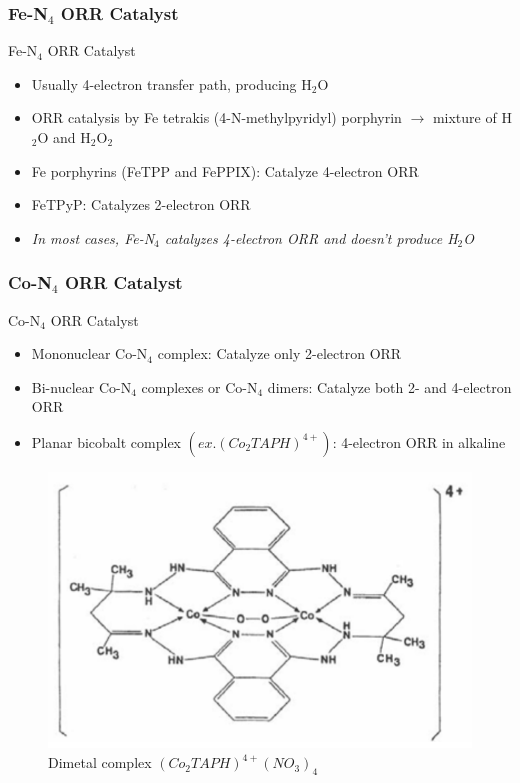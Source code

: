 \documentclass{beamer}
\begin{document}
\begin{frame}
\frametitle{Fe-N$_4$ ORR Catalyst}
\begin{block}{Fe-N$_4$ ORR Catalyst}

\begin{itemize}
\item{Usually 4-electron transfer path, producing H$_2$O}
\item{ORR catalysis by Fe tetrakis (4-N-methylpyridyl) porphyrin $\longrightarrow$ mixture of H$_2$O and H$_2$O$_2$ }
\item{Fe porphyrins (FeTPP and FePPIX): Catalyze 4-electron ORR}
\item{FeTPyP: Catalyzes 2-electron ORR}
\item{\emph{In most cases, Fe-N$_4$ catalyzes 4-electron ORR and doesn't produce H$_2$O}}
\end{itemize}

\end{block}
\end{frame}
\begin{frame}
\frametitle{Co-N$_4$ ORR Catalyst}
\begin{block}{Co-N$_4$ ORR Catalyst}

\begin{itemize}
\item{Mononuclear Co-N$_4$ complex: Catalyze only 2-electron ORR}
\item{Bi-nuclear Co-N$_4$ complexes or Co-N$_4$ dimers: \newline Catalyze both 2- and 4-electron ORR}
\item{Planar bicobalt complex $(ex. (Co_2TAPH)^{4+})$: 4-electron ORR in alkaline}
\end{itemize}

\end{block}

\begin{figure}[htbp]
    \begin{center}
    \includegraphics[scale=0.35]{image2}
    \caption {Dimetal complex $(Co_2TAPH)^{4+}(NO_3)_4$}
    \end{center}
\end{figure}

\end{frame}
\end{document}

